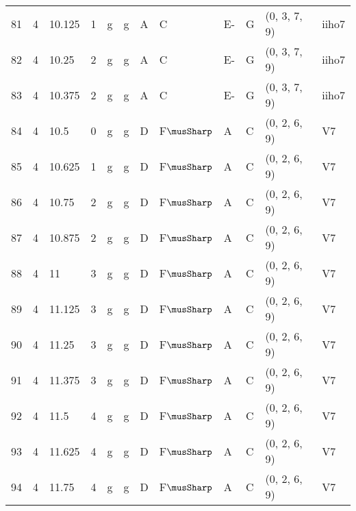 \begin{tabular}{llllllllllll}
81  & 4       & 10.125 & 1               & g          & g              & A      & C       & E-     & G         & (0, 3, 7, 9)     & iiho7          \\
82  & 4       & 10.25  & 2               & g          & g              & A      & C       & E-     & G         & (0, 3, 7, 9)     & iiho7          \\
83  & 4       & 10.375 & 2               & g          & g              & A      & C       & E-     & G         & (0, 3, 7, 9)     & iiho7          \\
84  & 4       & 10.5   & 0               & g          & g              & D      & F$\musSharp$      & A      & C         & (0, 2, 6, 9)     & V7             \\
85  & 4       & 10.625 & 1               & g          & g              & D      & F$\musSharp$      & A      & C         & (0, 2, 6, 9)     & V7             \\
86  & 4       & 10.75  & 2               & g          & g              & D      & F$\musSharp$      & A      & C         & (0, 2, 6, 9)     & V7             \\
87  & 4       & 10.875 & 2               & g          & g              & D      & F$\musSharp$      & A      & C         & (0, 2, 6, 9)     & V7             \\
88  & 4       & 11     & 3               & g          & g              & D      & F$\musSharp$      & A      & C         & (0, 2, 6, 9)     & V7             \\
89  & 4       & 11.125 & 3               & g          & g              & D      & F$\musSharp$      & A      & C         & (0, 2, 6, 9)     & V7             \\
90  & 4       & 11.25  & 3               & g          & g              & D      & F$\musSharp$      & A      & C         & (0, 2, 6, 9)     & V7             \\
91  & 4       & 11.375 & 3               & g          & g              & D      & F$\musSharp$      & A      & C         & (0, 2, 6, 9)     & V7             \\
92  & 4       & 11.5   & 4               & g          & g              & D      & F$\musSharp$      & A      & C         & (0, 2, 6, 9)     & V7             \\
93  & 4       & 11.625 & 4               & g          & g              & D      & F$\musSharp$      & A      & C         & (0, 2, 6, 9)     & V7             \\
94  & 4       & 11.75  & 4               & g          & g              & D      & F$\musSharp$      & A      & C         & (0, 2, 6, 9)     & V7             \\

\end{tabular}
